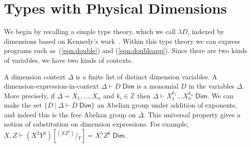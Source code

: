 \documentclass[a4paper,UKenglish]{lipics}
\theoremstyle{plain}
\newcommand{\msf}[1]{\mathsf{#1}} %
\newcommand{\Dj}[2]{#1 \vdash #2 \; \msf{ Dim}}
\newcommand{\Dim}{D}
\newcommand{\Dvar}{X}
\begin{document}
\section{Types with Physical Dimensions}
\label{sec:Not}
We begin by recalling a simple type theory, which we call $\lambda D$, indexed by dimensions based on Kennedy's work~\cite{Kennedy:1997:RPU:263699.263761}. Within this type theory we can express programs such as~(\ref{eqn:double}) and (\ref{eqn:doubleapp}). Since there are two kinds of variables, we have two kinds of contexts.

\vspace{3mm} 
A dimension context $\Delta$ is a finite list of distinct
dimension variables.
A dimension-expression-in-context $\Dj\Delta \Dim$ is a monomial
$\Dim$ in the variables $\Delta$.
More precisely,
if $\Delta=\Dvar_1,\ldots, \Dvar_n$ and $k_i\in\mathbb Z$
then $\Dj \Delta{\Dvar_1^{k_1}\dots \Dvar_n^{k_n}}$.
We can make the set $\{\Dim~|~\Dj \Delta \Dim\}$ an Abelian group under addition of
exponents, and indeed this is the free Abelian group on $\Delta$.
This universal property gives a notion of substitution on dimension expressions.
For example,
$\Dj{X,Z}{(X^2Y^3)[^{(XZ^2)}\!/\!_Y]=X^5Z^6}$.
\end{document}
